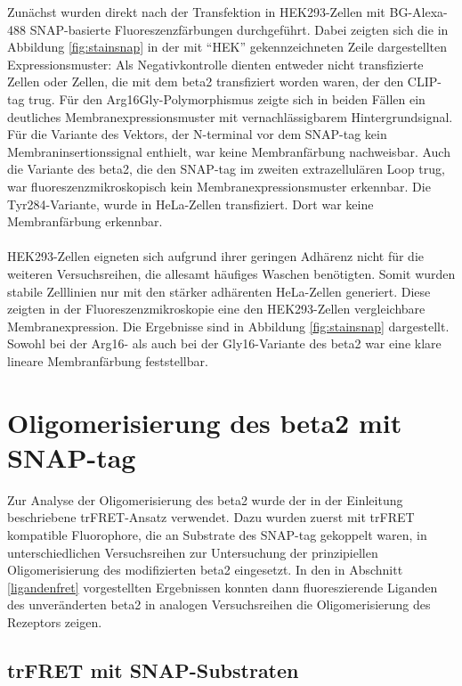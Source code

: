 Zunächst wurden direkt nach der Transfektion in HEK293-Zellen mit BG-Alexa-488 SNAP-basierte Fluoreszenzfärbungen durchgeführt. Dabei zeigten sich die in Abbildung \ref{fig:stainsnap} in der mit "`HEK"' gekennzeichneten Zeile dargestellten Expressionsmuster: Als Negativkontrolle dienten entweder nicht transfizierte Zellen oder Zellen, die mit dem \gls{beta2} transfiziert worden waren, der den CLIP-tag trug. Für den Arg16Gly-Polymorphismus zeigte sich in beiden Fällen ein deutliches Membranexpressionsmuster mit vernachlässigbarem Hintergrundsignal. Für die Variante des Vektors, der N-terminal vor dem SNAP-tag kein Membraninsertionssignal enthielt, war keine Membranfärbung nachweisbar. Auch die Variante des \gls{beta2}, die den SNAP-tag im zweiten extrazellulären Loop trug, war fluoreszenzmikroskopisch kein Membranexpressionsmuster erkennbar. Die Tyr284-Variante, wurde in HeLa-Zellen transfiziert. Dort war keine Membranfärbung erkennbar.
\\ \\
HEK293-Zellen eigneten sich aufgrund ihrer geringen Adhärenz nicht für die weiteren Versuchsreihen, die allesamt häufiges Waschen benötigten. Somit wurden stabile Zelllinien nur mit den stärker adhärenten HeLa-Zellen generiert. Diese zeigten in der Fluoreszenzmikroskopie eine den HEK293-Zellen vergleichbare Membranexpression. Die Ergebnisse sind in Abbildung \ref{fig:stainsnap} dargestellt. Sowohl bei der Arg16- als auch bei der Gly16-Variante des \gls{beta2} war eine klare lineare Membranfärbung feststellbar.

\section{Oligomerisierung des \gls{beta2} mit SNAP-tag}
Zur Analyse der Oligomerisierung des \gls{beta2} wurde der in der Einleitung beschriebene trFRET-Ansatz verwendet. Dazu wurden zuerst mit trFRET kompatible Fluorophore, die an Substrate des SNAP-tag gekoppelt waren, in unterschiedlichen Versuchsreihen zur Untersuchung der prinzipiellen Oligomerisierung des modifizierten \gls{beta2} eingesetzt. In den in Abschnitt \ref{ligandenfret} vorgestellten Ergebnissen konnten dann fluoreszierende Liganden des unveränderten \gls{beta2} in analogen Versuchsreihen die Oligomerisierung des Rezeptors zeigen.

\subsection{trFRET mit SNAP-Substraten}

